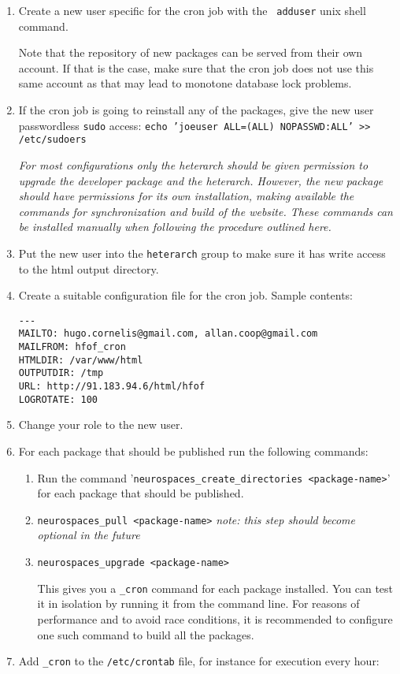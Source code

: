 \documentclass[12pt]{article}
\begin{document}
\begin{enumerate}
\item Create a new user specific for the cron job with the {\tt
    adduser} unix shell command.

  Note that the repository of new packages can be served from their
  own account.  If that is the case, make sure that the cron job does
  not use this same account as that may lead to monotone database lock
  problems.

\item If the cron job is going to reinstall any of the packages, give
  the new user passwordless {\tt sudo} access: {\tt echo 'joeuser
    ALL=(ALL) NOPASSWD:ALL' >> /etc/sudoers}

  {\it For most configurations only the heterarch should be given
    permission to upgrade the developer package and the heterarch.
    However, the new package should have permissions for its own
    installation, making available the commands for synchronization
    and build of the website.  These commands can be installed
    manually when following the procedure outlined here.}

\item Put the new user into the {\tt heterarch} group to make sure it
  has write access to the html output directory.
\item Create a suitable configuration file for the cron job.  Sample
  contents:
\begin{verbatim}
---
MAILTO: hugo.cornelis@gmail.com, allan.coop@gmail.com
MAILFROM: hfof_cron
HTMLDIR: /var/www/html
OUTPUTDIR: /tmp
URL: http://91.183.94.6/html/hfof
LOGROTATE: 100
\end{verbatim}
\item Change your role to the new user.
\item For each package that should be published run the following
  commands:
  \begin{enumerate}
  \item Run the command '{\tt neurospaces\_create\_directories
      <package-name>}' for each package that should be published.
  \item {\tt neurospaces\_pull <package-name>} {\it note: this step should
      become optional in the future}
  \item {\tt neurospaces\_upgrade <package-name>}

    This gives you a {\tt <package-name>\_cron} command for each
    package installed.  You can test it in isolation by running it
    from the command line.  For reasons of performance and to avoid
    race conditions, it is recommended to configure one such command
    to build all the packages.
  \end{enumerate}
\item Add {\tt <package-name>\_cron} to the {\tt /etc/crontab} file, for
  instance for execution every hour:


\end{enumerate}
\end{document}
